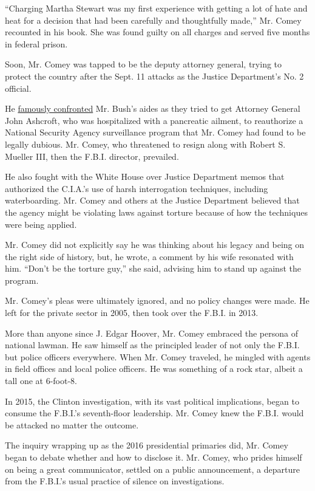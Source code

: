 ``Charging Martha Stewart was my first experience with getting a lot of
hate and heat for a decision that had been carefully and thoughtfully
made,'' Mr. Comey recounted in his book. She was found guilty on all
charges and served five months in federal prison.

Soon, Mr. Comey was tapped to be the deputy attorney general, trying to
protect the country after the Sept. 11 attacks as the Justice
Department's No. 2 official.

He
\href{https://www.nytimes.com/2007/05/16/washington/16nsa.html}{famously
confronted} Mr. Bush's aides as they tried to get Attorney General John
Ashcroft, who was hospitalized with a pancreatic ailment, to reauthorize
a National Security Agency surveillance program that Mr. Comey had found
to be legally dubious. Mr. Comey, who threatened to resign along with
Robert S. Mueller III, then the F.B.I. director, prevailed.

He also fought with the White House over Justice Department memos that
authorized the C.I.A.'s use of harsh interrogation techniques, including
waterboarding. Mr. Comey and others at the Justice Department believed
that the agency might be violating laws against torture because of how
the techniques were being applied.

Mr. Comey did not explicitly say he was thinking about his legacy and
being on the right side of history, but, he wrote, a comment by his wife
resonated with him. ``Don't be the torture guy,'' she said, advising him
to stand up against the program.

Mr. Comey's pleas were ultimately ignored, and no policy changes were
made. He left for the private sector in 2005, then took over the F.B.I.
in 2013.

More than anyone since J. Edgar Hoover, Mr. Comey embraced the persona
of national lawman. He saw himself as the principled leader of not only
the F.B.I. but police officers everywhere. When Mr. Comey traveled, he
mingled with agents in field offices and local police officers. He was
something of a rock star, albeit a tall one at 6-foot-8.

In 2015, the Clinton investigation, with its vast political
implications, began to consume the F.B.I.'s seventh-floor leadership.
Mr. Comey knew the F.B.I. would be attacked no matter the outcome.

The inquiry wrapping up as the 2016 presidential primaries did, Mr.
Comey began to debate whether and how to disclose it. Mr. Comey, who
prides himself on being a great communicator, settled on a public
announcement, a departure from the F.B.I.'s usual practice of silence on
investigations.

